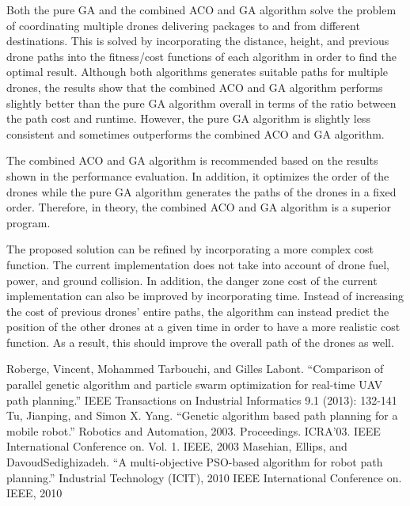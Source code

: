 \documentclass[conference]{IEEEtran}
\begin{document}
Both the pure GA and the combined ACO and GA algorithm solve the problem of coordinating multiple drones delivering packages to and from different destinations. This is solved by incorporating the distance, height, and previous drone paths into the fitness/cost functions of each algorithm in order to find the optimal result. Although both algorithms generates suitable paths for multiple drones, the results show that the combined ACO and GA algorithm performs slightly better than the pure GA algorithm overall in terms of the ratio between the path cost and runtime. However, the pure GA algorithm is slightly less consistent and sometimes outperforms the combined ACO and GA algorithm.

The combined ACO and GA algorithm is recommended based on the results shown in the performance evaluation. In addition, it optimizes the order of the drones while the pure GA algorithm generates the paths of the drones in a fixed order. Therefore, in theory, the combined ACO and GA algorithm is a superior program.

The proposed solution can be refined by incorporating a more complex cost function. The current implementation does not take into account of drone fuel, power, and ground collision. In addition, the danger zone cost of the current implementation can also be improved by incorporating time. Instead of increasing the cost of previous drones' entire paths, the algorithm can instead predict the position of the other drones at a given time in order to have a more realistic cost function. As a result, this should improve the overall path of the drones as well.

\begin{thebibliography}{00}
 Roberge, Vincent, Mohammed Tarbouchi, and Gilles Labont. ``Comparison of parallel genetic algorithm and particle swarm optimization for real-time UAV path planning.'' IEEE Transactions on Industrial Informatics 9.1 (2013): 132-141
 Tu, Jianping, and Simon X. Yang. ``Genetic algorithm based path planning for a mobile robot.'' Robotics and Automation, 2003. Proceedings. ICRA'03. IEEE International Conference on. Vol. 1. IEEE, 2003
 Masehian, Ellips, and DavoudSedighizadeh. ``A multi-objective PSO-based algorithm for robot path planning.'' Industrial Technology (ICIT), 2010 IEEE International Conference on. IEEE, 2010
\end{thebibliography}
\end{document}
